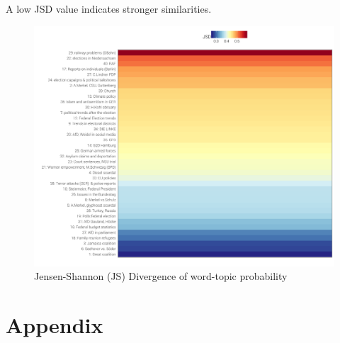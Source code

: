 \documentclass[12pt,a4paper,notitlepage]{article}
\begin{document}
A low JSD value indicates stronger similarities.

\begin{figure}[H]
	\begin{center}
	\includegraphics[width=\textwidth,keepaspectratio]{../figs/jsd.png}
	\caption{Jensen-Shannon (JS) Divergence of word-topic probability}
	\label{fig_jsd}
	\end{center}
\end{figure}


\section*{Appendix}
\end{document}
